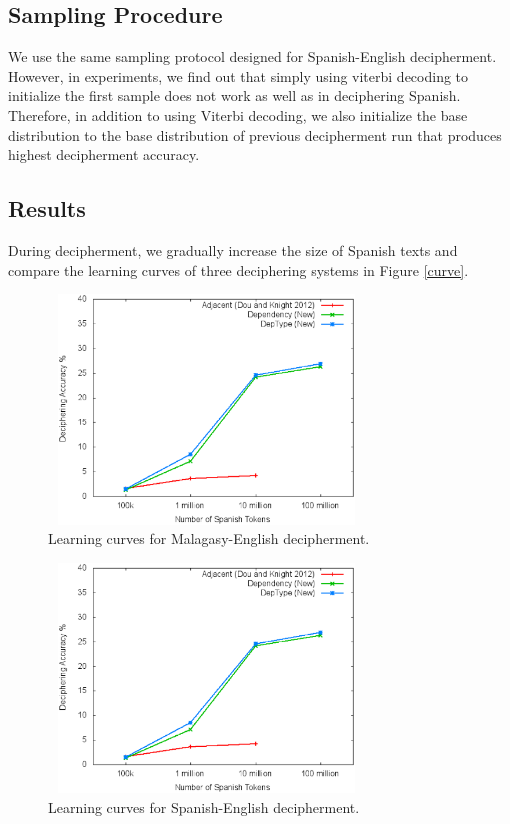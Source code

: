 \subsection{Sampling Procedure}
We use the same sampling protocol designed for Spanish-English decipherment. However, in experiments, we find out that simply using viterbi decoding to initialize the first sample does not work as well as in deciphering Spanish. Therefore, in addition to using Viterbi decoding, we also initialize the base distribution to the base distribution of previous decipherment run that produces highest decipherment accuracy.

\subsection{Results}
During decipherment, we gradually increase the size of Spanish texts and compare the learning curves of three deciphering systems in Figure \ref{curve}.

 \begin{figure}[!ht]
  \centering
  \includegraphics[width=3.3in,height=2.4in]{curve}
  \caption{Learning curves for Malagasy-English decipherment.}
\label{mlg-en-curve}
\end{figure}

 \begin{figure}[!ht]
  \centering
  \includegraphics[width=3.3in,height=2.4in]{curve}
  \caption{Learning curves for Spanish-English decipherment.}
\label{es-en-curve}
\end{figure}

